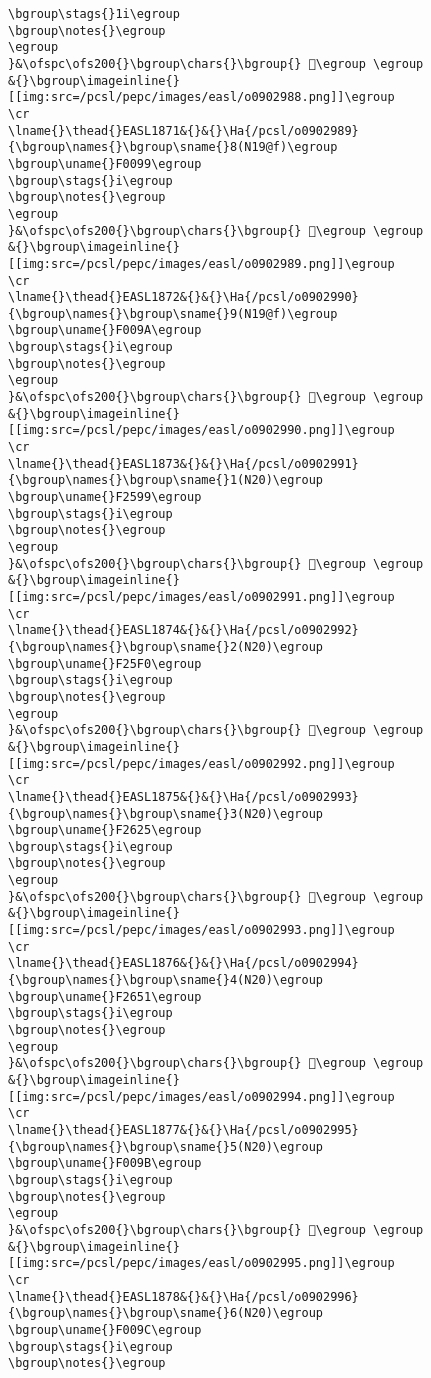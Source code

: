 \begin{verbatim}
\bgroup\stags{}1i\egroup
\bgroup\notes{}\egroup
\egroup
}&\ofspc\ofs200{}\bgroup\chars{}\bgroup{} 󰂘\egroup \egroup
&{}\bgroup\imageinline{}[[img:src=/pcsl/pepc/images/easl/o0902988.png]]\egroup
\cr
\lname{}\thead{}EASL1871&{}&{}\Ha{/pcsl/o0902989}{\bgroup\names{}\bgroup\sname{}8(N19@f)\egroup
\bgroup\uname{}F0099\egroup
\bgroup\stags{}i\egroup
\bgroup\notes{}\egroup
\egroup
}&\ofspc\ofs200{}\bgroup\chars{}\bgroup{} 󰂙\egroup \egroup
&{}\bgroup\imageinline{}[[img:src=/pcsl/pepc/images/easl/o0902989.png]]\egroup
\cr
\lname{}\thead{}EASL1872&{}&{}\Ha{/pcsl/o0902990}{\bgroup\names{}\bgroup\sname{}9(N19@f)\egroup
\bgroup\uname{}F009A\egroup
\bgroup\stags{}i\egroup
\bgroup\notes{}\egroup
\egroup
}&\ofspc\ofs200{}\bgroup\chars{}\bgroup{} 󰂚\egroup \egroup
&{}\bgroup\imageinline{}[[img:src=/pcsl/pepc/images/easl/o0902990.png]]\egroup
\cr
\lname{}\thead{}EASL1873&{}&{}\Ha{/pcsl/o0902991}{\bgroup\names{}\bgroup\sname{}1(N20)\egroup
\bgroup\uname{}F2599\egroup
\bgroup\stags{}i\egroup
\bgroup\notes{}\egroup
\egroup
}&\ofspc\ofs200{}\bgroup\chars{}\bgroup{} 󲖙\egroup \egroup
&{}\bgroup\imageinline{}[[img:src=/pcsl/pepc/images/easl/o0902991.png]]\egroup
\cr
\lname{}\thead{}EASL1874&{}&{}\Ha{/pcsl/o0902992}{\bgroup\names{}\bgroup\sname{}2(N20)\egroup
\bgroup\uname{}F25F0\egroup
\bgroup\stags{}i\egroup
\bgroup\notes{}\egroup
\egroup
}&\ofspc\ofs200{}\bgroup\chars{}\bgroup{} 󲗰\egroup \egroup
&{}\bgroup\imageinline{}[[img:src=/pcsl/pepc/images/easl/o0902992.png]]\egroup
\cr
\lname{}\thead{}EASL1875&{}&{}\Ha{/pcsl/o0902993}{\bgroup\names{}\bgroup\sname{}3(N20)\egroup
\bgroup\uname{}F2625\egroup
\bgroup\stags{}i\egroup
\bgroup\notes{}\egroup
\egroup
}&\ofspc\ofs200{}\bgroup\chars{}\bgroup{} 󲘥\egroup \egroup
&{}\bgroup\imageinline{}[[img:src=/pcsl/pepc/images/easl/o0902993.png]]\egroup
\cr
\lname{}\thead{}EASL1876&{}&{}\Ha{/pcsl/o0902994}{\bgroup\names{}\bgroup\sname{}4(N20)\egroup
\bgroup\uname{}F2651\egroup
\bgroup\stags{}i\egroup
\bgroup\notes{}\egroup
\egroup
}&\ofspc\ofs200{}\bgroup\chars{}\bgroup{} 󲙑\egroup \egroup
&{}\bgroup\imageinline{}[[img:src=/pcsl/pepc/images/easl/o0902994.png]]\egroup
\cr
\lname{}\thead{}EASL1877&{}&{}\Ha{/pcsl/o0902995}{\bgroup\names{}\bgroup\sname{}5(N20)\egroup
\bgroup\uname{}F009B\egroup
\bgroup\stags{}i\egroup
\bgroup\notes{}\egroup
\egroup
}&\ofspc\ofs200{}\bgroup\chars{}\bgroup{} 󰂛\egroup \egroup
&{}\bgroup\imageinline{}[[img:src=/pcsl/pepc/images/easl/o0902995.png]]\egroup
\cr
\lname{}\thead{}EASL1878&{}&{}\Ha{/pcsl/o0902996}{\bgroup\names{}\bgroup\sname{}6(N20)\egroup
\bgroup\uname{}F009C\egroup
\bgroup\stags{}i\egroup
\bgroup\notes{}\egroup

\end{verbatim}
